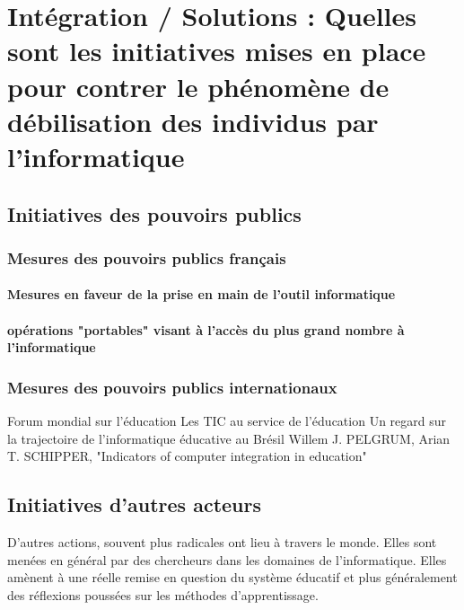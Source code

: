 
\chapter{Intégration / Solutions : Quelles sont les initiatives mises en place pour contrer le phénomène de débilisation des individus par l'informatique}\label{initiatives_actuelles}

\section{Initiatives des pouvoirs publics}

\subsection{Mesures des pouvoirs publics français}
\subsubsection{Mesures en faveur de la prise en main de l'outil informatique}
\cite{b2i_c2i}
\cite{b2i}
\cite{isn}

\subsubsection{opérations "portables" visant à l'accès du plus grand nombre à l'informatique}
\cite{portables35}
\cite{portables60}
\cite{portables40}

    


\subsection{Mesures des pouvoirs publics internationaux}
Forum mondial sur l’éducation \cite{educ_forum}
Les TIC au service de l’éducation \cite{tics}
Un regard sur la trajectoire de l’informatique éducative au Brésil \cite{peixoto2006regard}
Willem J. PELGRUM, Arian T. SCHIPPER, "Indicators of computer integration in education" \cite{pelgrum1993indicators}



\section{Initiatives d'autres acteurs}

D'autres actions, souvent plus radicales ont lieu à travers le monde. Elles sont menées en général par des chercheurs dans les domaines de l'informatique. Elles amènent à une réelle remise en question du système éducatif et plus généralement des réflexions poussées sur les méthodes d'apprentissage.


